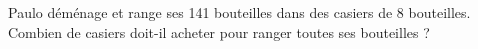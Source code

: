 
Paulo déménage et range ses 141 bouteilles dans des casiers de 8 bouteilles. Combien de casiers doit-il acheter pour ranger toutes  ses bouteilles ?